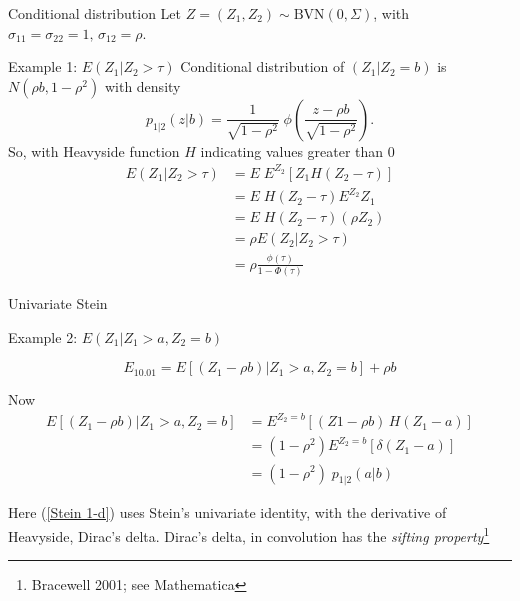 \begin{frame}{Conditional distribution}
Let \(Z=(Z_1,Z_2) \sim \mbox{BVN}(0,\Sigma)\), with
\(\sigma_{11}=\sigma_{22}=1, \, \sigma_{12}=\rho\).

\begin{exampleblock}{Example 1: \(E(Z_1| Z_2 > \tau)\)}
Conditional distribution of \((Z_1| Z_2=b)\) is \(N(\rho b, 1-\rho^2)\)
with density\\
\begin{equation}
  p_{1|2}(z|b)= \frac{1}{\sqrt{1-\rho^2}}\; \phi\left(\frac{z-\rho b}{\sqrt{1-\rho^2}}\right) .
  \end{equation}
So, with Heavyside function \(H\) indicating values greater than 0 \\
\begin{equation}
  \begin{split}
  E(Z_1| Z_2 > \tau) &= E\; E^{Z_2} [Z_1 H(Z_2-\tau)] \\
    &=  E\; H(Z_2-\tau) E^{Z_2} Z_1 \\
    &=  E\; H(Z_2-\tau) (\rho Z_2) \\
    &=  \rho E (Z_2| Z_2 > \tau) \\
    &= \rho \frac{\phi(\tau)}{1-\Phi(\tau)}
  \end{split}
  \end{equation}
\end{exampleblock}
\end{frame}

\begin{frame}{Univariate Stein}

\begin{exampleblock}{Example 2:  \(E (Z_1| Z_1 > a, Z_2 = b)\)}

\begin{equation} \label{E10.01}
  E_{10.01} = E[(Z_1-\rho b)| Z_1>a, Z_2 =b]  + \rho b
  \end{equation}

Now\\

\begin{equation}
  \begin{split}
  E[(Z_1-\rho b)| Z_1>a, Z_2 =b] &= E^{Z_2=b} [(Z1-\rho b) \,H(Z_1-a)] \\
    &= (1-\rho^2) E^{Z_2=b} [\delta(Z_1-a)] \\ \label{Stein 1-d}
    &= (1-\rho^2)\;p_{1|2}(a|b)  
  \end{split}
  \end{equation}

Here (\ref{Stein 1-d}) uses Stein's univariate identity, with the
derivative of Heavyside, Dirac's delta. Dirac's delta, in convolution
has the \emph{sifting
property}\footnote{Bracewell 2001; see Mathematica}
\end{exampleblock}

\end{frame}
